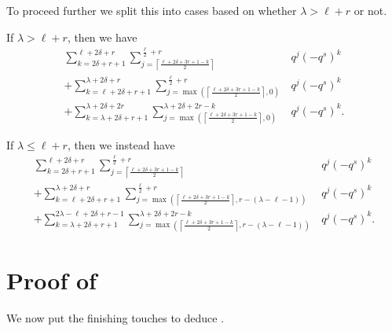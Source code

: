 To proceed further we split this into cases based on whether $\lambda > \ell+r$ or not.
\begin{itemize}
  \ii If $\lambda > \ell + r$, then we have
  \begin{equation}
  \begin{aligned}
    \sum_{k = 2 \delta + r + 1}^{\ell + 2\delta + r}
    \sum_{j = \left\lceil \frac{\ell + 2\delta + 3r + 1 - k}{2} \right\rceil}
      ^{\frac{\ell}{2} + r}
      & q^j (-q^s)^k \\
    + \sum_{k = \ell + 2 \delta + r + 1}^{\lambda + 2 \delta + r}
    \sum_{j=\max\left( \left\lceil \frac{\ell + 2\delta + 3r + 1 - k}{2} \right\rceil, 0\right)}
      ^{\frac{\ell}{2} + r}
      & q^j (-q^s)^k \\
    + \sum_{k = \lambda + 2\delta + r + 1}^{\lambda + 2 \delta + 2r}
    \sum_{j=\max\left( \left\lceil \frac{\ell + 2\delta + 3r + 1 - k}{2} \right\rceil, 0 \right)}
      ^{\lambda+2\delta+2r-k}
      & q^j (-q^s)^k.
  \end{aligned}
  \label{eq:ell_even_missing1}
  \end{equation}

  \ii If $\lambda \le \ell + r$, then we instead have
  \begin{equation}
  \begin{aligned}
    \sum_{k = 2 \delta + r + 1}^{\ell + 2\delta + r}
    \sum_{j = \left\lceil \frac{\ell + 2\delta + 3r + 1 - k}{2} \right\rceil}
      ^{\frac{\ell}{2} + r}
      & q^j (-q^s)^k \\
    + \sum_{k = \ell + 2 \delta + r + 1}^{\lambda + 2 \delta + r}
    \sum_{j=\max\left( \left\lceil \frac{\ell + 2\delta + 3r + 1 - k}{2} \right\rceil,
      r-(\lambda-\ell-1)\right)}
      ^{\frac{\ell}{2} + r}
      & q^j (-q^s)^k \\
    + \sum_{k = \lambda + 2\delta + r + 1}^{2\lambda - \ell + 2\delta + r - 1}
    \sum_{j=\max\left( \left\lceil \frac{\ell + 2\delta + 3r + 1 - k}{2} \right\rceil,
      r-(\lambda-\ell-1)\right)}^{\lambda+2\delta+2r-k}
      & q^j (-q^s)^k.
  \end{aligned}
  \label{eq:ell_even_missing2}
  \end{equation}
\end{itemize}

\section{Proof of }
We now put the finishing touches to deduce .

